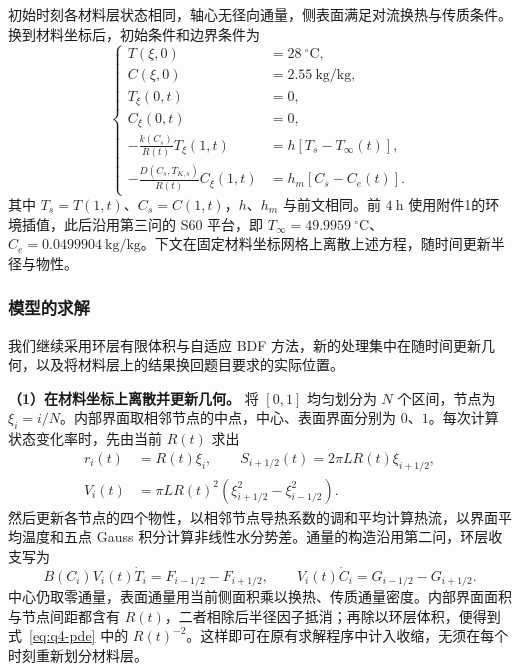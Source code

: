 \documentclass[UTF8,a4paper]{ctexart}
\begin{document}
初始时刻各材料层状态相同，轴心无径向通量，侧表面满足对流换热与传质条件。换到材料坐标后，初始条件和边界条件为
\begin{equation}
\left\{
\begin{aligned}
T(\xi,0)&=28~^\circ\mathrm C, \\ C(\xi,0)&=2.55~\mathrm{kg/kg},\\
T_\xi(0,t)&=0, \\ C_\xi(0,t)&=0,\\
-\frac{k(C_s)}{R(t)}T_\xi(1,t)&=h[T_s-T_\infty(t)],\\
-\frac{D(C_s,T_{K,s})}{R(t)}C_\xi(1,t)&=h_m[C_s-C_e(t)].
\end{aligned}
\right.
\label{eq:q4-conditions}
\end{equation}
其中 \(T_s=T(1,t)\)、\(C_s=C(1,t)\)，\(h\)、\(h_m\) 与前文相同。前 \(4~\mathrm h\) 使用附件1的环境插值，此后沿用第三问的 S60 平台，即 \(T_\infty=49.9959~^\circ\mathrm C\)、\(C_e=0.0499904~\mathrm{kg/kg}\)。下文在固定材料坐标网格上离散上述方程，随时间更新半径与物性。

\subsubsection{模型的求解}
\label{sec:q4-solution}

我们继续采用环层有限体积与自适应 BDF 方法，新的处理集中在随时间更新几何，以及将材料层上的结果换回题目要求的实际位置。

\noindent\textbf{（1）在材料坐标上离散并更新几何。}
将 \([0,1]\) 均匀划分为 \(N\) 个区间，节点为 \(\xi_i=i/N\)。内部界面取相邻节点的中点，中心、表面界面分别为 \(0\)、\(1\)。每次计算状态变化率时，先由当前 \(R(t)\) 求出
\begin{equation}
\begin{aligned}
r_i(t)&=R(t)\xi_i,\qquad
S_{i+1/2}(t)=2\pi LR(t)\xi_{i+1/2},\\
V_i(t)&=\pi LR(t)^2
 \left(\xi_{i+1/2}^2-\xi_{i-1/2}^2\right).
\end{aligned}
\label{eq:q4-discrete-geometry}
\end{equation}
然后更新各节点的四个物性，以相邻节点导热系数的调和平均计算热流，以界面平均温度和五点 Gauss 积分计算非线性水分势差。通量的构造沿用第二问，环层收支写为
\begin{equation}
B(C_i)V_i(t)\dot T_i=F_{i-1/2}-F_{i+1/2},\qquad
V_i(t)\dot C_i=G_{i-1/2}-G_{i+1/2}.
\label{eq:q4-fvm}
\end{equation}
中心仍取零通量，表面通量用当前侧面积乘以换热、传质通量密度。内部界面面积与节点间距都含有 \(R(t)\)，二者相除后半径因子抵消；再除以环层体积，便得到式~\eqref{eq:q4-pde} 中的 \(R(t)^{-2}\)。这样即可在原有求解程序中计入收缩，无须在每个时刻重新划分材料层。
\end{document}
